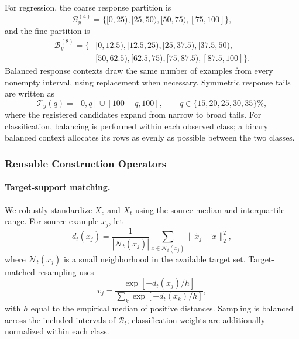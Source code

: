 For regression, the coarse response partition is
\begin{equation}
  \mathcal B_y^{(4)}
  =\{[0,25),[25,50),[50,75),[75,100]\},
  \label{eq:response-quartile-bins}
\end{equation}
and the fine partition is
\begin{equation}
\begin{aligned}
  \mathcal B_y^{(8)}=\{&[0,12.5),[12.5,25),[25,37.5),[37.5,50),\\
                       &[50,62.5),[62.5,75),[75,87.5),[87.5,100]\}.
\end{aligned}
\label{eq:response-octile-bins}
\end{equation}
Balanced response contexts draw the same number of examples from every
nonempty interval, using replacement when necessary. Symmetric response tails
are written as
\begin{equation}
  \mathcal T_y(q)=[0,q]\cup[100-q,100],\qquad
  q\in\{15,20,25,30,35\}\%,
  \label{eq:symmetric-response-tails}
\end{equation}
where the registered candidates expand from narrow to broad tails. For
classification, balancing is performed within each observed class; a binary
balanced context allocates its rows as evenly as possible between the two classes.

\subsubsection{Reusable Construction Operators}

\paragraph{Target-support matching.}
We robustly standardize $X_c$ and $X_t$ using the source median and
interquartile range. For source example $x_j$, let
\begin{equation}
  d_t(x_j)=\frac{1}{|\mathcal N_t(x_j)|}
  \sum_{x\in\mathcal N_t(x_j)}\|\widetilde x_j-\widetilde x\|_2^2,
  \label{eq:target-support-distance}
\end{equation}
where $\mathcal N_t(x_j)$ is a small neighborhood in the available target set.
Target-matched resampling uses
\begin{equation}
  v_j=\frac{\exp[-d_t(x_j)/h]}{\sum_k\exp[-d_t(x_k)/h]},
  \label{eq:target-matching-weight}
\end{equation}
with $h$ equal to the empirical median of positive distances. Sampling is
balanced across the included intervals of $\mathcal B_t$; classification
weights are additionally normalized within each class.

